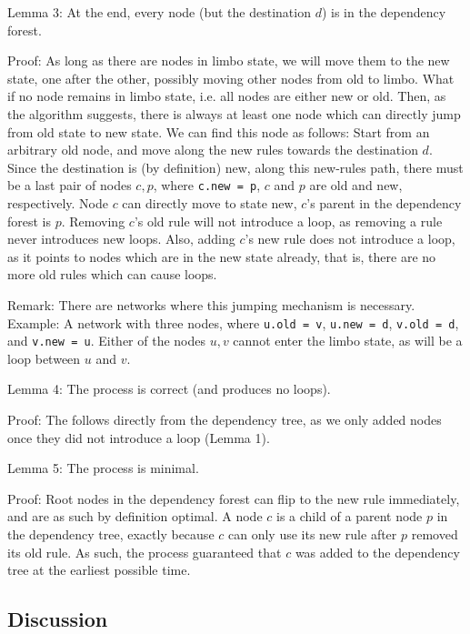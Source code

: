 Lemma 3: At the end, every node (but the destination $d$) is in the dependency forest.

Proof: As long as there are nodes in limbo state, we will move them to the new state, one after the other, possibly moving other nodes from old to limbo. What if no node remains in limbo state, i.e. all nodes are either new or old. Then, as the algorithm suggests, there is always at least one node which can directly jump from old state to new state. We can find this node as follows: Start from an arbitrary old node, and move along the new rules towards the destination $d$. Since the destination is (by definition) new, along this new-rules path, there must be a last pair of nodes $c,p$, where \texttt{c.new = p}, $c$ and $p$ are old and new, respectively. Node $c$ can directly move to state new, $c$'s parent in the dependency forest is $p$. Removing $c$'s old rule will not introduce a loop, as removing a rule never introduces new loops. Also, adding $c$'s new rule does not introduce a loop, as it points to nodes which are in the new state already, that is, there are no more old rules which can cause loops. 

Remark: There are networks where this jumping mechanism is necessary. Example: A network with three nodes, where \texttt{u.old = v}, \texttt{u.new = d}, \texttt{v.old = d}, and \texttt{v.new = u}. Either of the nodes $u,v$ cannot enter the limbo state, as will be a loop between $u$ and $v$. 

Lemma 4: The process is correct (and produces no loops).

Proof: The follows directly from the dependency tree, as we only added nodes once they did not introduce a loop (Lemma 1).

Lemma 5: The process is minimal.

Proof: Root nodes in the dependency forest can flip to the new rule immediately, and are as such by definition optimal. A node $c$ is a child of a parent node $p$ in the dependency tree, exactly because $c$ can only use its new rule after $p$ removed its old rule. As such, the process guaranteed that $c$ was added to the dependency tree at the earliest possible time.

\subsection{Discussion} %


